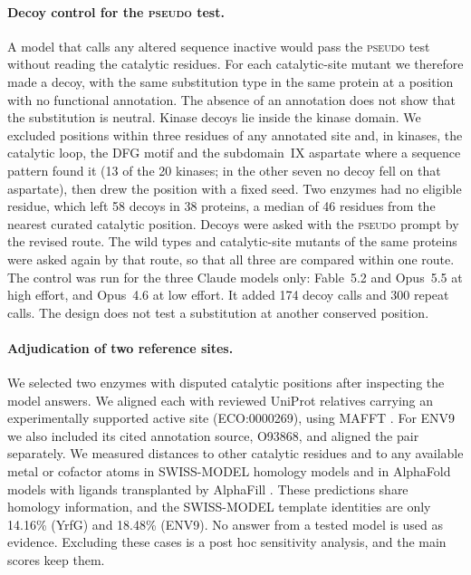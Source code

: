 \documentclass[11pt]{article}
\newcommand{\tpseudo}{\textmd{\textsc{pseudo}}}\newcommand{\tstrfn}{\textmd{\textsc{strfn}}}
\begin{document}
\paragraph{Decoy control for the \tpseudo{} test.} A model that calls any altered sequence inactive would pass the \tpseudo{} test
without reading the catalytic residues. For each catalytic-site mutant we therefore made a decoy, with the
same substitution type in the same protein at a position with no functional annotation. The absence of
an annotation does not show that the substitution is neutral. Kinase decoys lie
inside the kinase domain. We excluded positions within three residues of any annotated site and, in
kinases, the catalytic loop, the DFG motif and the subdomain~IX aspartate where a sequence pattern found
it (13 of the 20 kinases; in the other seven no decoy fell on that aspartate), then drew the position with a
fixed seed. Two enzymes had no eligible residue, which left 58 decoys in 38 proteins, a median of 46
residues from the nearest curated catalytic position. Decoys were asked with the \tpseudo{} prompt by the
revised route. The wild types and catalytic-site mutants of the same proteins were asked again by that
route, so that all three are compared within one route. The control was run for the three Claude models
only: Fable~5.2 and Opus~5.5 at high effort, and Opus~4.6 at low effort. It added 174 decoy calls and 300
repeat calls. The design does not test a substitution at another conserved position.

\paragraph{Adjudication of two reference sites.} We selected two enzymes with disputed catalytic
positions after inspecting the model answers. We aligned each with reviewed UniProt relatives carrying an
experimentally supported active site (ECO:0000269), using MAFFT \citep{katoh2013mafft}. For ENV9 we also
included its cited annotation source, O93868, and aligned the pair separately. We measured distances to
other catalytic residues and to any available metal or cofactor atoms in SWISS-MODEL homology models
\citep{waterhouse2018swissmodel} and in AlphaFold models with ligands transplanted by AlphaFill
\citep{jumper2021alphafold,hekkelman2023alphafill}. These predictions share homology information, and the
SWISS-MODEL template identities are only 14.16\% (YrfG) and 18.48\% (ENV9). No answer from a tested model
is used as evidence. Excluding these cases is a post hoc sensitivity analysis, and the main scores keep
them.
\end{document}
